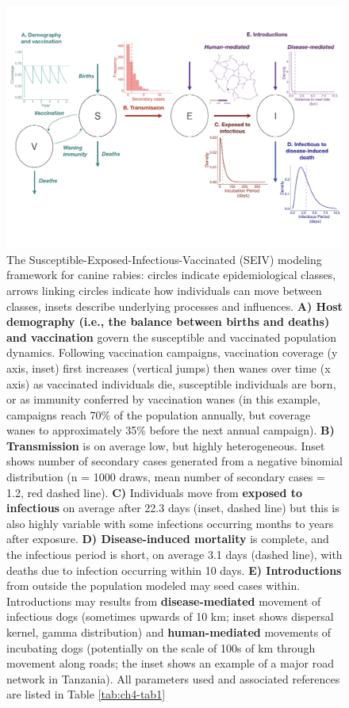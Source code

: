 \documentclass[
  oneside]{book}
\begin{document}
\begin{figure}
\includegraphics[width=0.9\linewidth]{figs/ch3/image1} \caption[The Susceptible-Exposed-Infectious-Vaccinated (SEIV) modeling framework for canine rabies.]{The Susceptible-Exposed-Infectious-Vaccinated (SEIV)
modeling framework for canine rabies: circles indicate epidemiological
classes, arrows linking circles indicate how individuals can move
between classes, insets describe underlying processes and influences.
\textbf{A) Host demography (i.e., the balance between births and deaths) and
vaccination} govern the susceptible and vaccinated population dynamics.
Following vaccination campaigns, vaccination coverage (y axis, inset)
first increases (vertical jumps) then wanes over time (x axis) as
vaccinated individuals die, susceptible individuals are born, or as
immunity conferred by vaccination wanes (in this example, campaigns
reach 70\% of the population annually, but coverage wanes to
approximately 35\% before the next annual campaign). \textbf{B) Transmission}
is on average low, but highly heterogeneous. Inset shows number of
secondary cases generated from a negative binomial distribution (n =
1000 draws, mean number of secondary cases = 1.2, red dashed line).
\textbf{C)} Individuals move from \textbf{exposed to infectious} on average after
22.3 days (inset, dashed line) but this is also highly variable with
some infections occurring months to years after exposure. \textbf{D)
Disease-induced mortality} is complete, and the infectious period is
short, on average 3.1 days (dashed line), with deaths due to infection
occurring within 10 days. \textbf{E) Introductions} from outside the
population modeled may seed cases within. Introductions may results from
\textbf{disease-mediated} movement of infectious dogs (sometimes upwards of
10 km; inset shows dispersal kernel, gamma distribution) and
\textbf{human-mediated} movements of incubating dogs (potentially on the
scale of 100s of km through movement along roads; the inset shows an
example of a major road network in Tanzania). All parameters used and
associated references are listed in Table \ref{tab:ch4-tab1}}\label{fig:ch4-fig1}
\end{figure}
\end{document}
